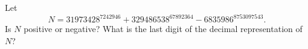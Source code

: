 Let
\[
N=31973428^{7242946}+329486538^{67892364}-6835986^{8753097543}.
\]
Is $N$ positive or negative? What is the last digit of the decimal representation of $N$?

